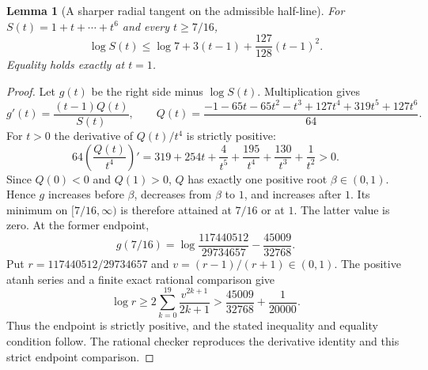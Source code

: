 \documentclass[11pt]{article}
\newtheorem{lemma}[theorem]{Lemma}
\theoremstyle{remark}
\numberwithin{equation}{section}
\begin{document}
\begin{lemma}[A sharper radial tangent on the admissible half-line]
\label{lem:noorigin-oct8-seven-restricted-tangent}
For $S(t)=1+t+\cdots+t^6$ and every $t\ge7/16$,
\begin{equation}\label{eq:noorigin-oct8-seven-restricted-tangent}
 \log S(t)\le\log7+3(t-1)+\frac{127}{128}(t-1)^2.
\end{equation}
Equality holds exactly at $t=1$.
\end{lemma}
\begin{proof}
Let $g(t)$ be the right side minus $\log S(t)$. Multiplication gives
\[
 g'(t)=\frac{(t-1)Q(t)}{S(t)},\qquad
 Q(t)=\frac{-1-65t-65t^2-t^3+127t^4+319t^5+127t^6}{64}.
\]
For $t>0$ the derivative of $Q(t)/t^4$ is strictly positive:
\[
 64\left(\frac{Q(t)}{t^4}\right)'
     =319+254t+\frac4{t^5}+\frac{195}{t^4}
                         +\frac{130}{t^3}+\frac1{t^2}>0.
\]
Since $Q(0)<0$ and $Q(1)>0$, $Q$ has exactly one positive root
$\beta\in(0,1)$. Hence $g$ increases before $\beta$, decreases
from $\beta$ to $1$, and increases after $1$. Its minimum on
$[7/16,\infty)$ is therefore attained at $7/16$ or at $1$.
The latter value is zero. At the former endpoint,
\[
 g(7/16)=\log\frac{117440512}{29734657}-\frac{45009}{32768}.
\]
Put $r=117440512/29734657$ and $v=(r-1)/(r+1)\in(0,1)$.
The positive atanh series and a finite exact rational comparison give
\[
 \log r\ge2\sum_{k=0}^{19}\frac{v^{2k+1}}{2k+1}
       >\frac{45009}{32768}+\frac1{20000}.
\]
Thus the endpoint is strictly positive, and the stated inequality
and equality condition follow. The rational checker reproduces
the derivative identity and this strict endpoint comparison.
\end{proof}
\end{document}
